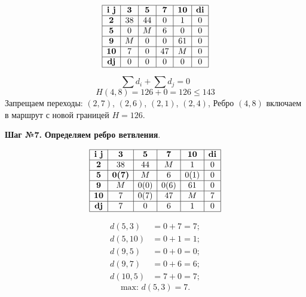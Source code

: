 \documentclass[17pt]{extarticle}
\begin{document}
\[
    \begin{array}{|c|c|c|c|c|c|}
        \hline
        \textbf{i j} & \textbf{3} & \textbf{5} & \textbf{7} & \textbf{10} & \textbf{di} \\
        \hline
        \textbf{2}   & 38         & 44         & 0          & 1           & 0           \\
        \hline
        \textbf{5}   & 0          & M          & 6          & 0           & 0           \\
        \hline
        \textbf{9}   & M          & 0          & 0          & 61          & 0           \\
        \hline
        \textbf{10}  & 7          & 0          & 47         & M           & 0           \\
        \hline
        \textbf{dj}  & 0          & 0          & 0          & 0           & 0           \\
        \hline
    \end{array}
\]

\[ \sum d_i + \sum d_j = 0 \]
\[ H(4,8) = 126 + 0 = 126 \leq 143 \]
Запрещаем переходы: \((2,7)\), \((2,6)\), \((2,1)\), \((2,4)\),
Ребро \((4,8)\) включаем в маршрут с новой границей \( H = 126 \).

\textbf{Шаг №7.}
\textbf{Определяем ребро ветвления}.

\[
    \begin{array}{|c|c|c|c|c|c|}
        \hline
        \textbf{i j} & \textbf{3}    & \textbf{5} & \textbf{7} & \textbf{10} & \textbf{di} \\
        \hline
        \textbf{2}   & 38            & 44         & M          & 1           & 0           \\
        \hline
        \textbf{5}   & \textbf{0(7)} & M          & 6          & 0(1)        & 0           \\
        \hline
        \textbf{9}   & M             & 0(0)       & 0(6)       & 61          & 0           \\
        \hline
        \textbf{10}  & 7             & 0(7)       & 47         & M           & 7           \\
        \hline
        \textbf{dj}  & 7             & 0          & 6          & 1           & 0           \\
        \hline
    \end{array}
\]

\[
    \begin{aligned}
        d(5,3)  & = 0 + 7 = 7; \\
        d(5,10) & = 0 + 1 = 1; \\
        d(9,5)  & = 0 + 0 = 0; \\
        d(9,7)  & = 0 + 6 = 6; \\
        d(10,5) & = 7 + 0 = 7;
    \end{aligned}
\]
\[ \text{max: } d(5,3) = 7. \]
\end{document}
